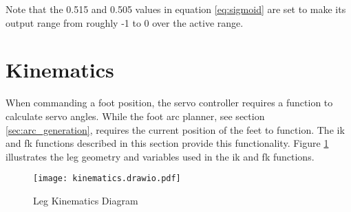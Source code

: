             \noindent
            Note that the 0.515 and 0.505 values in equation \ref{eq:sigmoid} are set to make its output range from roughly -1 to 0 over the active range.

\newpage
\section{Kinematics}
    When commanding a foot position, the servo controller requires a function to calculate servo angles. While the foot arc planner, see section 
    \ref{sec:arc_generation}, requires the current position of the feet to function. The \ac{ik} and \ac{fk} functions described in this section provide
    this functionality. Figure \ref{fig:kinematics} illustrates the leg geometry and variables used in the \ac{ik} and \ac{fk} functions.
    \begin{figure}[h]
        \centering
        \texttt{[image: kinematics.drawio.pdf]}
        \caption{Leg Kinematics Diagram}
        \label{fig:kinematics}
    \end{figure}

